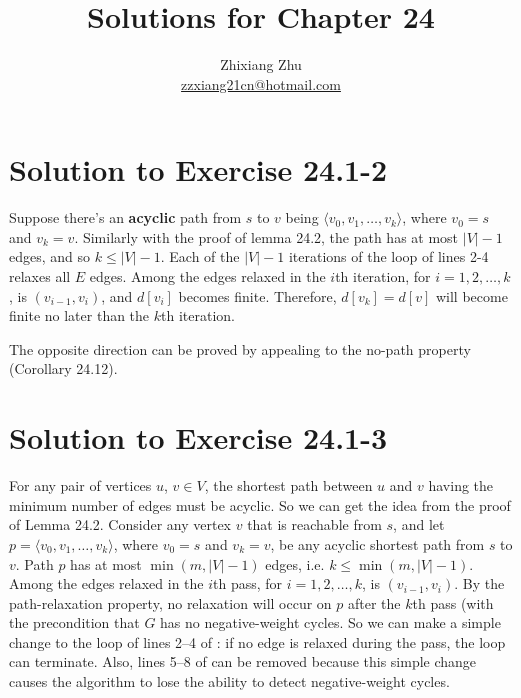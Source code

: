 \documentclass[a4paper, fleqn]{article}
\title{Solutions for Chapter 24}
\author{Zhixiang Zhu  \\\href{mailto:zzxiang21cn@hotmail.com}{zzxiang21cn@hotmail.com}}
\begin{document}
\maketitle

\section*{Solution to Exercise 24.1-2}

Suppose there's an {\bf acyclic} path from $s$ to $v$ being $\langle v_0, v_1, \ldots, v_k
\rangle$, where $v_0 = s$ and $v_k = v$. Similarly with the proof of lemma 24.2, the path
has at most $|V| - 1$ edges, and so $k \leq |V| - 1$. Each of the $|V| - 1$ iterations of
the \For loop of lines 2-4 relaxes all $E$ edges. Among the edges relaxed in the $i$th
iteration, for $i = 1, 2, \ldots, k$, is $(v_{i - 1}, v_i)$, and $d[v_i]$ becomes finite.
Therefore, $d[v_k] = d[v]$ will become finite no later than the $k$th iteration.

The opposite direction can be proved by appealing to the no-path property (Corollary
24.12).

\section*{Solution to Exercise 24.1-3}

For any pair of vertices $u$, $v \in V$, the shortest path between $u$ and $v$ having the
minimum number of edges must be acyclic. So we can get the idea from the proof of Lemma
24.2. Consider any vertex $v$ that is reachable from $s$, and let $p = \langle v_0, v_1,
\ldots, v_k \rangle$, where $v_0 = s$ and $v_k = v$, be any acyclic shortest path from $s$
to $v$. Path $p$ has at most $\min(m, |V|-1)$ edges, i.e. $k \leq \min(m, |V|-1)$. Among
the edges relaxed in the $i$th pass, for $i = 1, 2, \ldots, k$, is $(v_{i-1}, v_i)$. By
the path-relaxation property, no relaxation will occur on $p$ after the $k$th pass (with
the precondition that $G$ has no negative-weight cycles. So we can make a simple change to
the \For loop of lines 2--4 of : if no edge is relaxed during the pass,
the loop can terminate. Also, lines 5--8 of  can be removed because
this simple change causes the algorithm to lose the ability to detect negative-weight
cycles.
\end{document}

